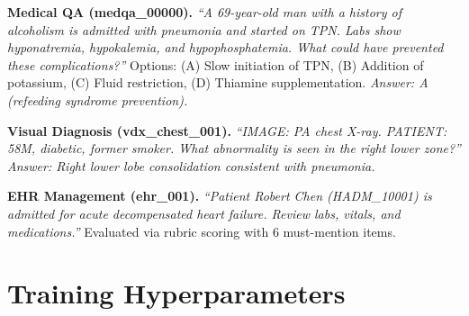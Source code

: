 \documentclass{article}
\begin{document}
\textbf{Medical QA (medqa\_00000).} \emph{``A 69-year-old man with a history of alcoholism is admitted with pneumonia and started on TPN. Labs show hyponatremia, hypokalemia, and hypophosphatemia. What could have prevented these complications?''} Options: (A) Slow initiation of TPN, (B) Addition of potassium, (C) Fluid restriction, (D) Thiamine supplementation. \emph{Answer: A (refeeding syndrome prevention).}

\textbf{Visual Diagnosis (vdx\_chest\_001).} \emph{``IMAGE: PA chest X-ray. PATIENT: 58M, diabetic, former smoker. What abnormality is seen in the right lower zone?''} \emph{Answer: Right lower lobe consolidation consistent with pneumonia.}

\textbf{EHR Management (ehr\_001).} \emph{``Patient Robert Chen (HADM\_10001) is admitted for acute decompensated heart failure. Review labs, vitals, and medications.''} Evaluated via rubric scoring with 6 must-mention items.


\section{Training Hyperparameters}
\label{app:hyperparams}
\end{document}

